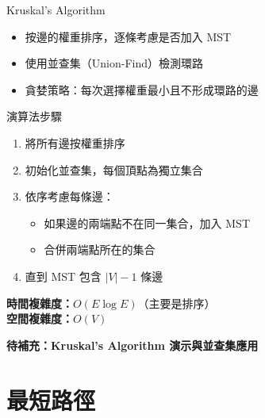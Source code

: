 \documentclass{beamer}
\begin{document}
\begin{frame}{Kruskal's Algorithm}
\begin{itemize}
    \item 按邊的權重排序，逐條考慮是否加入 MST
    \item 使用並查集（Union-Find）檢測環路
    \item 貪婪策略：每次選擇權重最小且不形成環路的邊
\end{itemize}

\vspace{1em}
\begin{block}{演算法步驟}
\begin{enumerate}
    \item 將所有邊按權重排序
    \item 初始化並查集，每個頂點為獨立集合
    \item 依序考慮每條邊：
    \begin{itemize}
        \item 如果邊的兩端點不在同一集合，加入 MST
        \item 合併兩端點所在的集合
    \end{itemize}
    \item 直到 MST 包含 $|V| - 1$ 條邊
\end{enumerate}
\end{block}

\vspace{1em}
\textbf{時間複雜度：}$O(E \log E)$（主要是排序）\\
\textbf{空間複雜度：}$O(V)$

\vspace{1em}
\textbf{待補充：Kruskal's Algorithm 演示與並查集應用}
\end{frame}

\section{最短路徑}
\end{document}
